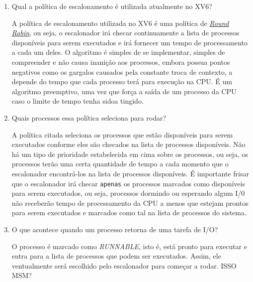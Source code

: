 \documentclass{article}
\begin{document}
\begin{enumerate}
      \item Qual a política de escalonamento é utilizada atualmente no XV6?

            A política de escalonamento utilizada no XV6 é uma política de
            \href{https://en.wikipedia.org/wiki/Round-robin_scheduling}{\textit{Round
                        Robin}}, ou seja, o escalonador irá checar
            continuamente a lista de processos disponíveis para serem
            executados e irá
            fornecer um tempo de processamento a cada um deles. O algoritmo é
            simples de se implementar, simples de compreender e não causa
            inanição aos
            processos, embora possua pontos negativos como os gargalos causados
            pela
            constante troca de contexto, a depende do tempo que cada processo
            terá para
            execução na CPU. É um algoritmo preemptivo, uma vez que força a
            saída de um processo da CPU caso o limite de tempo tenha sidoa
            tingido.\@

      \item Quais processos essa política seleciona para rodar?

            A política citada seleciona os processos que estão disponíveis para
            serem executados conforme eles são checados na lista de processos
            disponíveis.
            Não há um tipo de prioridade estabelecida em cima sobre os
            processos, ou seja, os processos terão uma certa quantidade de
            tempo a cada
            momento que o escalonador encontrá-los na lista de processos
            disponíveis. É
            importante frisar que o escalonador irá checar \texttt{apenas} os
            processos marcados como disponíveis para serem executados, ou seja,
            processos dormindo ou esperando algum I/0 não receberão tempo de
            processamento
            da CPU a menos que estejam prontos para serem executados e marcados
            como tal na
            lista de processos do sistema.

      \item O que acontece quando um processo retorna de uma tarefa de I/O?

            O processo é marcado como \textit{RUNNABLE}, isto é, está pronto
            para executar e entra para a lista de processos que podem ser
            executados.
            Assim, ele ventualmente será escolhido pelo escalonador para
            começar a rodar. ISSO MSM?


\end{enumerate}
\end{document}
